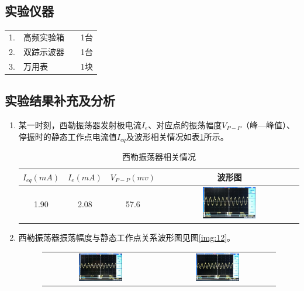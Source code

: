 \documentclass[12pt]{article}%
\numberwithin{equation}{section}
\begin{document}
\subsection{实验仪器}
\begin{tabular}{clcc}
1. &高频实验箱& & 1台 \\       
2. &双踪示波器     & &    1台\\
3.&万用表    &       & 1块\\
\end{tabular}

\subsection{实验结果补充及分析}
\begin{enumerate}\addtolength{\itemsep}{-1.5ex}
\item 某一时刻，西勒振荡器发射极电流$I_e$、对应点的振荡幅度$V_{P-P}$（峰—峰值）、停振时的静态工作点电流值$I_{eq}$及波形相关情况如表\ref{my-label}所示。
\begin{table}[ht]
\centering
\caption{西勒振荡器相关情况}
\label{my-label}
\begin{tabular}{|c|c|c|c|}
\hline
$I_{eq}(mA)$          & $I_{e}(mA)$           & $V_{P-P}(mv)$ &波形图\\ \hline
1.90& 2.08 & 57.6     &\includegraphics[width=0.4\textwidth]{gaopin1/gaopin106.jpg}     \\  \hline
\end{tabular}
\end{table}
\item 西勒振荡器振荡幅度与静态工作点关系波形图见图\ref{img:12}。
\begin{figure}[ht]
\centering
\label{tab11}
\begin{tabular}{cc}
 \includegraphics[width=0.4\textwidth]{gaopin1/gaopin103.jpg} &\includegraphics[width=0.4\textwidth]{gaopin1/gaopin102.jpg} \\ 

\end{tabular}
\end{figure}
\end{enumerate}
\end{document}
